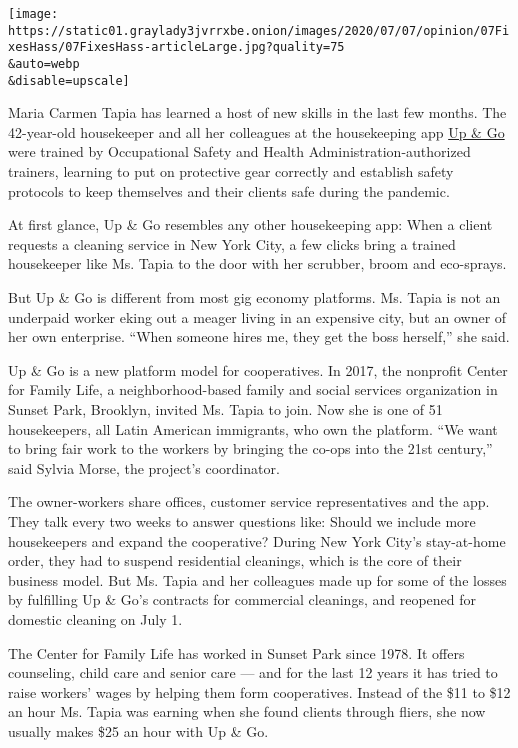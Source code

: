 \texttt{[image: https://static01.graylady3jvrrxbe.onion/images/2020/07/07/opinion/07FixesHass/07FixesHass-articleLarge.jpg?quality=75\\\&auto=webp\\\&disable=upscale]}

Maria Carmen Tapia has learned a host of new skills in the last few
months. The 42-year-old housekeeper and all her colleagues at the
housekeeping app \href{https://www.upandgo.coop/}{Up \& Go} were trained
by Occupational Safety and Health Administration-authorized trainers,
learning to put on protective gear correctly and establish safety
protocols to keep themselves and their clients safe during the pandemic.

At first glance, Up \& Go resembles any other housekeeping app: When a
client requests a cleaning service in New York City, a few clicks bring
a trained housekeeper like Ms. Tapia to the door with her scrubber,
broom and eco-sprays.

But Up \& Go is different from most gig economy platforms. Ms. Tapia is
not an underpaid worker eking out a meager living in an expensive city,
but an owner of her own enterprise. ``When someone hires me, they get
the boss herself,'' she said.

Up \& Go is a new platform model for cooperatives. In 2017, the
nonprofit Center for Family Life, a neighborhood-based family and social
services organization in Sunset Park, Brooklyn, invited Ms. Tapia to
join. Now she is one of 51 housekeepers, all Latin American immigrants,
who own the platform. ``We want to bring fair work to the workers by
bringing the co-ops into the 21st century,'' said Sylvia Morse, the
project's coordinator.

The owner-workers share offices, customer service representatives and
the app. They talk every two weeks to answer questions like: Should we
include more housekeepers and expand the cooperative? During New York
City's stay-at-home order, they had to suspend residential cleanings,
which is the core of their business model. But Ms. Tapia and her
colleagues made up for some of the losses by fulfilling Up \& Go's
contracts for commercial cleanings, and reopened for domestic cleaning
on July 1.

The Center for Family Life has worked in Sunset Park since 1978. It
offers counseling, child care and senior care --- and for the last 12
years it has tried to raise workers' wages by helping them form
cooperatives. Instead of the \$11 to \$12 an hour Ms. Tapia was earning
when she found clients through fliers, she now usually makes \$25 an
hour with Up \& Go.


